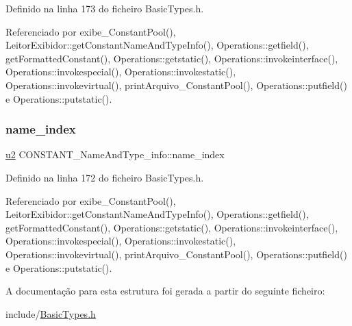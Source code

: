 Definido na linha 173 do ficheiro Basic\+Types.\+h.



Referenciado por exibe\+\_\+\+Constant\+Pool(), Leitor\+Exibidor\+::get\+Constant\+Name\+And\+Type\+Info(), Operations\+::getfield(), get\+Formatted\+Constant(), Operations\+::getstatic(), Operations\+::invokeinterface(), Operations\+::invokespecial(), Operations\+::invokestatic(), Operations\+::invokevirtual(), print\+Arquivo\+\_\+\+Constant\+Pool(), Operations\+::putfield() e Operations\+::putstatic().

\mbox{\label{structCONSTANT__NameAndType__info_adbaa813f9f3a32dc04a8bc65b5b2433d}} 
\subsubsection{\texorpdfstring{name\+\_\+index}{name\_index}}
{\footnotesize\ttfamily \hyperlink{BasicTypes_8h_a732cde1300aafb73b0ea6c2558a7a54f}{u2} C\+O\+N\+S\+T\+A\+N\+T\+\_\+\+Name\+And\+Type\+\_\+info\+::name\+\_\+index}



Definido na linha 172 do ficheiro Basic\+Types.\+h.



Referenciado por exibe\+\_\+\+Constant\+Pool(), Leitor\+Exibidor\+::get\+Constant\+Name\+And\+Type\+Info(), Operations\+::getfield(), get\+Formatted\+Constant(), Operations\+::getstatic(), Operations\+::invokeinterface(), Operations\+::invokespecial(), Operations\+::invokestatic(), Operations\+::invokevirtual(), print\+Arquivo\+\_\+\+Constant\+Pool(), Operations\+::putfield() e Operations\+::putstatic().



A documentação para esta estrutura foi gerada a partir do seguinte ficheiro\+:\begin{DoxyCompactItemize}
\item 
include/\hyperlink{BasicTypes_8h}{Basic\+Types.\+h}\end{DoxyCompactItemize}
